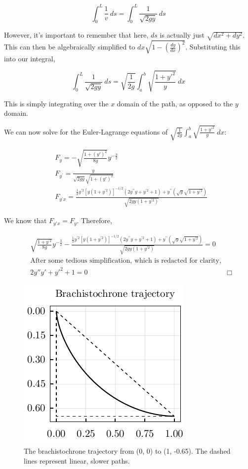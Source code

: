 \documentclass[%
 amsmath,amssymb,
aps,
 fleqn,
 notitlepage,
]{revtex4-2}
\begin{document}
\[\int_0^L \frac 1v ~ ds = \int_0^L \frac{1}{\sqrt{2gy}} ~ ds\]

However, it's important to remember that here, $ds$ is actually just $\sqrt{dx^2 + dy^2}$.  This can then be algebraically simplified to $dx\sqrt{1 - \left(\frac{dy}{dx}\right)^2}$.  Substituting this into our integral,

\[\int_0^L \frac{1}{\sqrt{2gy}} ~ ds = \sqrt{\frac{1}{2g}} \int_a^b \sqrt{\frac{1 + y'^2}{y}} ~ dx\]

This is simply integrating over the $x$ domain of the path, as opposed to the $y$ domain.

We can now solve for the Euler-Lagrange equations of $\displaystyle \sqrt{\frac{1}{2g}} \int_a^b \sqrt{\frac{1 + y'^2}{y}} ~ dx$:

\begin{align*}
    &F_{y}=-\sqrt{\frac{1+(y')^2}{8 g}} y^{-\frac32}\\
    &F_{y^{\prime}}=\frac{y}{\sqrt{2 g y} \sqrt{1+(y')^2}}\\
    &F_{y^{\prime} x}=\frac{\frac{1}{2} y^{\prime 2}\left[y\left(1+y^{\prime 2}\right)\right]^{-1 / 2}\left(2 y^{\prime \prime} y+y^{\prime 2}+1\right)+y^{\prime \prime}(\sqrt{y} \sqrt{1+y^{\prime 2}})}{\sqrt{2 g y\left(1+y^{\prime 2}\right)}}
\end{align*}

We know that $F_{y'x} = F_y$.  Therefore, %

\begin{align*}
    &\sqrt{\frac{1+y^{\prime 2}}{8 g}} y^{-\frac{3}{2}}-\frac{\frac{1}{2} y^{\prime 2}\left[y\left(1+y^{\prime 2}\right)\right]^{-1 / 2}\left(2 y^{\prime \prime} y+y^{\prime 2}+1\right)+y^{\prime \prime}(\sqrt{y} \sqrt{1+y^{\prime 2}})}{\sqrt{2 g y\left(1+y^{\prime 2}\right)}}=0\\
    &\text{After some tedious simplification, which is redacted for clarity,}\\
    &2y''y' + y'^2 + 1 = 0 & \Box
\end{align*}

\begin{figure}[ht!]
    \includegraphics{brachistochrone.pdf}
    \caption{The brachistochrone trajectory from (0, 0) to (1, -0.65).  The dashed lines represent linear, slower paths.}
    \label{fig: brachistochrone}
\end{figure}
\end{document}
